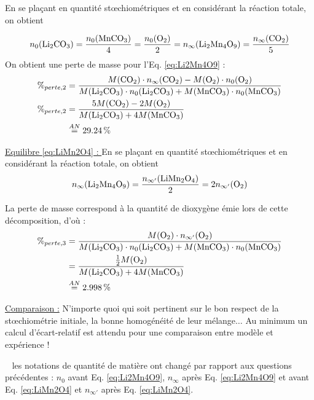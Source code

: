 \documentclass[twoside,a4paper,11pt,addpoints,answers]{exam}%
\begin{document}
\begin{questions}
\begin{mybox}
\begin{solution}[9cm]
En se plaçant en quantité st{\oe}chiométriques et en considérant la réaction totale, on obtient

\begin{align*}
n_0 ( \ce{Li2CO3} ) = \frac{n_0 (\ce{MnCO3} ) }{4} = \frac{n_0 ( \ce{O2} )}{2} = n_\infty( \ce{Li2Mn4O9} ) = \frac{n_\infty ( \ce{CO2} )}{5}
\end{align*}
On obtient une perte de masse pour l'Eq. \ref{eq:Li2Mn4O9} : 
\begin{align*}
\%_{perte, 2} &= \frac{M ( \ce{CO2} ) \cdot n_\infty ( \ce{CO2} ) - M ( \ce{O2} ) \cdot  n_0 ( \ce{O2} )}{M ( \ce{Li2CO3} ) \cdot n_0 ( \ce{Li2CO3} ) + M ( \ce{MnCO3} ) \cdot  n_0 ( \ce{MnCO3} )} \\
\%_{perte, 2} &=  \frac{5 M ( \ce{CO2} ) - 2 M ( \ce{O2} )}{M ( \ce{Li2CO3} ) + 4 M ( \ce{MnCO3} )}\\
&\stackrel{AN}{=} \SI{29.24}{\percent}
\end{align*}

\underline{Equilibre \ref{eq:LiMn2O4} : }
En se plaçant en quantité st{\oe}chiométriques et en considérant la réaction totale, on obtient 
\begin{align*}
n_\infty (\ce{Li2Mn4O9}) = \frac{n_{\infty'} (\ce{LiMn2O4})}{2} = 2 n_{\infty'} (\ce{O2})
\end{align*}

La perte de masse correspond à la quantité de dioxygène émie lors de cette décomposition, d'où : 
\begin{align*}
\%_{perte,3} &= \frac{M ( \ce{O2} ) \cdot n_{\infty'} ( \ce{O2} )}{M ( \ce{Li2CO3} ) \cdot n_0 ( \ce{Li2CO3} ) + M ( \ce{MnCO3} ) \cdot  n_0 ( \ce{MnCO3} )} \\
&= \frac{\frac{1}{2} M ( \ce{O2} )}{M ( \ce{Li2CO3} ) + 4 M ( \ce{MnCO3} )} \\
&\stackrel{AN}{=} \SI{2.998}{\percent} 
\end{align*}

\underline{Comparaison :} N'importe quoi qui soit pertinent sur le bon respect de la st{\oe}chiométrie initiale, la bonne homogénéité de leur mélange$\ldots$ Au minimum un calcul d'écart-relatif est attendu pour une comparaison entre modèle et expérience !

\faWarning ~ les notations de quantité de matière ont changé par rapport aux questions précédentes : $n_0$ avant Eq. \ref{eq:Li2Mn4O9}, $n_\infty$ après Eq. \ref{eq:Li2Mn4O9} et avant Eq. \ref{eq:LiMn2O4} et $n_{\infty'}$ après Eq. \ref{eq:LiMn2O4}.
\end{solution}\end{mybox}



\end{questions}
\end{document}
